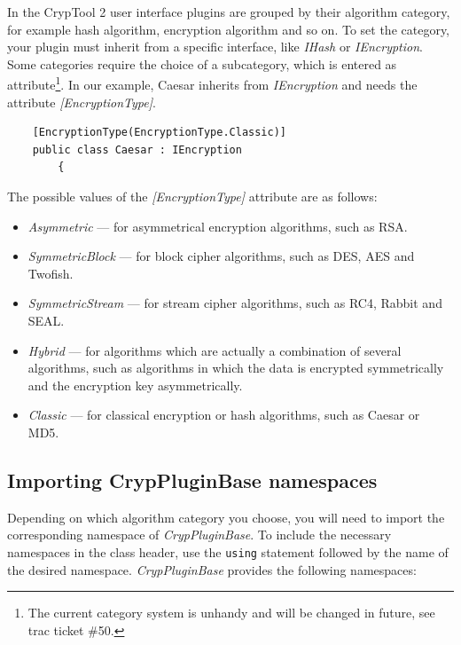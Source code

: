 In the CrypTool 2 user interface plugins are grouped by their algorithm category, for example hash algorithm, encryption algorithm and so on. To set the category, your plugin must inherit from a specific interface, like \textit{IHash} or \textit{IEncryption}. Some categories require the choice of a subcategory, which is entered as attribute\footnote{The current category system is unhandy and will be changed in future, see trac ticket \#50.}. In our example, Caesar inherits from \textit{IEncryption} and needs the attribute \textit{[EncryptionType]}.

\begin{lstlisting}
    [EncryptionType(EncryptionType.Classic)]
    public class Caesar : IEncryption
		{
\end{lstlisting}

The possible values of the \textit{[EncryptionType]} attribute are as follows:

\begin{itemize}
	\item \textit{Asymmetric} --- for asymmetrical encryption algorithms, such as RSA.
	\item \textit{SymmetricBlock} --- for block cipher algorithms, such as DES, AES and Twofish.
	\item \textit{SymmetricStream} --- for stream cipher algorithms, such as RC4, Rabbit and SEAL.
	\item \textit{Hybrid} --- for algorithms which are actually a combination of several algorithms, such as algorithms in which the data is encrypted symmetrically and the encryption key asymmetrically.
	\item \textit{Classic} --- for classical encryption or hash algorithms, such as Caesar or MD5.
\end{itemize}

\subsection{Importing CrypPluginBase namespaces}
\label{sec:ImportingCrypPluginBaseNamespaces}

Depending on which algorithm category you choose, you will need to import the corresponding namespace of \textit{CrypPluginBase}. To include the necessary namespaces in the class header, use the \texttt{using} statement followed by the name of the desired namespace. \textit{CrypPluginBase} provides the following namespaces:

